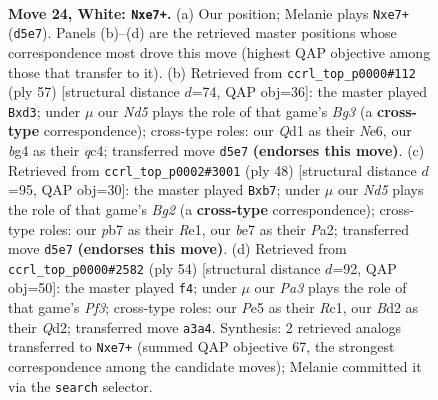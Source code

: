 \documentclass[11pt]{article}
\begin{document}
\clearpage

\begin{figure}[p]\centering
\begin{subfigure}{0.46\textwidth}\centering
\resizebox{\linewidth}{!}{%
\newchessgame
\chessboard[
  setfen={rn1qr1k1/pp2bppp/8/2PNP3/6b1/P5P1/1P1B1P2/1BRQR1K1 w - - 0 24},
  showmover=false,
  pgfstyle=straightmove, color=movearrow, markmove={d5-e7}
]}
\caption{}
\end{subfigure}\hfill
\begin{subfigure}{0.46\textwidth}\centering
\resizebox{\linewidth}{!}{%
\newchessgame
\chessboard[
  setfen={k1q1r2r/1p4pp/1P2npb1/p7/2Q5/2PB2P1/P6P/3RNRK1 b - - 0 29},
  showmover=false,
  pgfstyle=straightmove, color=movearrow, markmove={g6-d3}
]}
\caption{}
\end{subfigure}
\\[4pt]
\begin{subfigure}{0.46\textwidth}\centering
\resizebox{\linewidth}{!}{%
\newchessgame
\chessboard[
  setfen={2q1rnk1/pbr2pp1/1p1b3p/4P3/2p4P/4P1P1/PB3PBK/2RQR3 w - - 0 25},
  showmover=false,
  pgfstyle=straightmove, color=movearrow, markmove={g2-b7}
]}
\caption{}
\end{subfigure}\hfill
\begin{subfigure}{0.46\textwidth}\centering
\resizebox{\linewidth}{!}{%
\newchessgame
\chessboard[
  setfen={r2br1k1/2q2pp1/1nN5/p1BPpb1p/8/1B3PPP/3Q4/2R2RK1 w - - 1 28},
  showmover=false,
  pgfstyle=straightmove, color=movearrow, markmove={f3-f4}
]}
\caption{}
\end{subfigure}
\caption{\textbf{Move 24, White: \texttt{Nxe7+}.} (a) Our position; Melanie plays \texttt{Nxe7+} (\texttt{d5e7}). Panels (b)--(d) are the retrieved master positions whose correspondence most drove this move (highest QAP objective among those that transfer to it). (b) Retrieved from \texttt{ccrl\_top\_p0000\#112} (ply 57) [structural distance $d$=74, QAP obj=36]: the master played \texttt{Bxd3}; under $\mu$ our \emph{Nd5} plays the role of that game's \emph{Bg3} (a \textbf{cross-type} correspondence); cross-type roles: our \emph{Q}d1 as their \emph{N}e6, our \emph{b}g4 as their \emph{q}c4; transferred move \texttt{d5e7} \textbf{(endorses this move)}. (c) Retrieved from \texttt{ccrl\_top\_p0002\#3001} (ply 48) [structural distance $d$=95, QAP obj=30]: the master played \texttt{Bxb7}; under $\mu$ our \emph{Nd5} plays the role of that game's \emph{Bg2} (a \textbf{cross-type} correspondence); cross-type roles: our \emph{p}b7 as their \emph{R}e1, our \emph{b}e7 as their \emph{P}a2; transferred move \texttt{d5e7} \textbf{(endorses this move)}. (d) Retrieved from \texttt{ccrl\_top\_p0000\#2582} (ply 54) [structural distance $d$=92, QAP obj=50]: the master played \texttt{f4}; under $\mu$ our \emph{Pa3} plays the role of that game's \emph{Pf3}; cross-type roles: our \emph{P}e5 as their \emph{R}c1, our \emph{B}d2 as their \emph{Q}d2; transferred move \texttt{a3a4}. Synthesis: 2 retrieved analogs transferred to \texttt{Nxe7+} (summed QAP objective 67, the strongest correspondence among the candidate moves); Melanie committed it via the \texttt{search} selector.}
\label{fig:thought-m46}
\end{figure}
\end{document}
